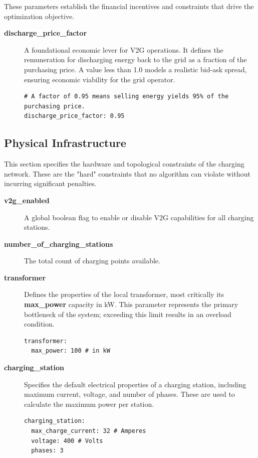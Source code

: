These parameters establish the financial incentives and constraints that drive the optimization objective.

\begin{description}
    \item[\textbf{\textbf{discharge\_price\_factor}}] A foundational economic lever for V2G operations. It defines the remuneration for discharging energy back to the grid as a fraction of the purchasing price. A value less than 1.0 models a realistic bid-ask spread, ensuring economic viability for the grid operator.
    \begin{lstlisting}
# A factor of 0.95 means selling energy yields 95% of the purchasing price.
discharge_price_factor: 0.95
    \end{lstlisting}
\end{description}

\subsection{Physical Infrastructure}

This section specifies the hardware and topological constraints of the charging network. These are the "hard" constraints that no algorithm can violate without incurring significant penalties.

\begin{description}
    \item[\textbf{\textbf{v2g\_enabled}}] A global boolean flag to enable or disable V2G capabilities for all charging stations.
    
    \item[\textbf{\textbf{number\_of\_charging\_stations}}] The total count of charging points available.
    
    \item[\textbf{\textbf{transformer}}] Defines the properties of the local transformer, most critically its \textbf{max\_power} capacity in kW. This parameter represents the primary bottleneck of the system; exceeding this limit results in an overload condition.
    \begin{lstlisting}
transformer:
  max_power: 100 # in kW
    \end{lstlisting}
    
    \item[\textbf{\textbf{charging\_station}}] Specifies the default electrical properties of a charging station, including maximum current, voltage, and number of phases. These are used to calculate the maximum power per station.
    \begin{lstlisting}
charging_station:  
  max_charge_current: 32 # Amperes
  voltage: 400 # Volts
  phases: 3
    \end{lstlisting}
\end{description}

